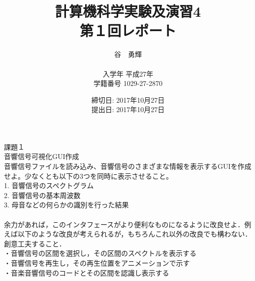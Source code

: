 \documentclass[a4j]{jarticle}
\begin{document}
\title{計算機科学実験及演習4 \\ \bf 第１回レポート}
\author{谷　勇輝 \\ \\入学年 平成27年 \\ 学籍番号 1029-27-2870}
\date{締切日: 2017年10月27日\\ 提出日: 2017年10月27日}
\maketitle
\newpage





\begin{screen}
課題１\\
音響信号可視化GUI作成\\
音響信号ファイルを読み込み、音響信号のさまざまな情報を表示するGUIを作成せよ。少なくとも以下の3つを同時に表示させること。\\
1. 音響信号のスペクトグラム\\
2. 音響信号の基本周波数\\
3. 母音などの何らかの識別を行った結果\\
\\
余力があれば，このインタフェースがより便利なものになるように改良せよ．例えば以下のような改良が考えられるが，もちろんこれ以外の改良でも構わない．創意工夫すること．\\
・音響信号の区間を選択し，その区間のスペクトルを表示する\\
・音響信号を再生し，その再生位置をアニメーションで示す\\
・音楽音響信号のコードとその区間を認識し表示する\\
\end{screen}
\end{document}
